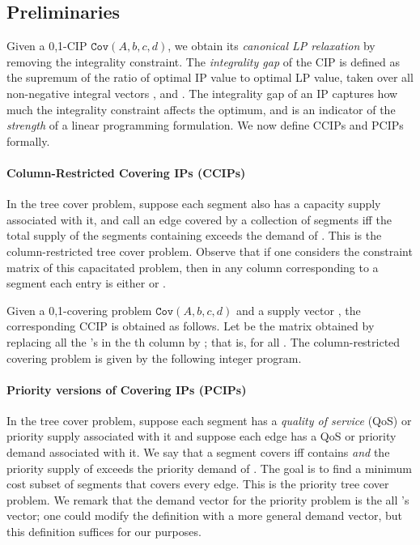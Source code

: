 \documentclass[11pt]{article}
\newcommand{\cov}[1]{\ensuremath{\mathtt{Cov}(#1)}}
\newcommand{\1}{\mathbb{1}}
\begin{document}
\iffalse
\vspace{-2mm}
\subsection{Preliminaries}
Given a 0,1-CIP \cov{A,b,c,d}, we obtain its {\em canonical LP
  relaxation} by removing the integrality constraint.  The {\em
  integrality gap} of the CIP is defined as the supremum of the ratio
of optimal IP value to optimal LP value, taken over all non-negative 
integral vectors , and . The integrality gap of an IP
captures how much the integrality constraint affects the optimum, and
is an indicator of the {\em strength} of a linear programming
formulation. We now define CCIPs and PCIPs formally. 

\vspace{-3mm}
\paragraph{Column-Restricted Covering IPs (CCIPs)}  
In the tree cover problem, suppose each segment
 also has a capacity supply  associated with it, and
call an edge  covered by a collection of segments  iff the total
supply of the segments containing  exceeds the demand of . This
is the column-restricted tree cover problem. Observe that if one
considers the constraint matrix of this capacitated problem, then in
any column corresponding to a segment  each entry is either
 or . 

Given a 0,1-covering problem \cov{A,b,c,d} and a supply vector
, the corresponding CCIP is obtained as follows. Let
 be the matrix obtained by replacing all the 's in the th
column by ; that is,  for all . The column-restricted covering problem is given 
by the following integer program.



\vspace{-3mm}
\paragraph{Priority versions of Covering IPs (PCIPs)}
In the tree cover problem, suppose each segment  has a {\em quality of
  service} (QoS) or priority supply  associated with it and suppose each edge
 has a QoS or priority demand  associated with it. We say that a segment
 covers  iff  contains  {\em and} the priority supply of 
exceeds the priority demand of . The goal is to find a minimum cost
subset of segments that covers every edge. This is the priority tree cover problem.
We remark that the
demand vector for the priority problem is the all 's vector; one
could modify the definition with a more general demand vector, but
this definition suffices for our purposes.
\end{document}

